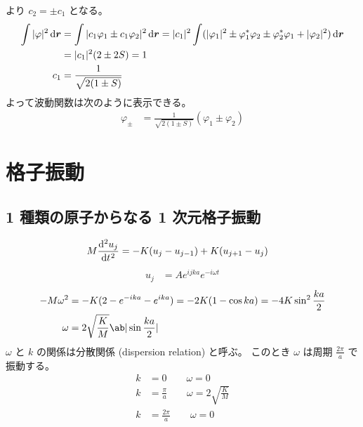 \documentclass[uplatex,dvipdfmx,a4paper,11pt]{jlreq}
\begin{document}
より $c_2 = \pm c_1$ となる。
\begin{align}
  \int|\varphi|^2\dl{\rr} & = \int|c_1\varphi_1 \pm c_1\varphi_2|^2\dl{\rr} = |c_1|^2\int(|\varphi_1|^2 \pm \varphi_1^*\varphi_2 \pm\varphi_2^*\varphi_1 + |\varphi_2|^2)\dl{\rr} \\
                          & = |c_1|^2(2 \pm 2S) = 1                                                                                                                               \\
  c_1                     & = \frac{1}{\sqrt{2(1 \pm S)}}
\end{align}
よって波動関数は次のように表示できる。
\begin{align}
  \varphi_\pm & = \frac{1}{\sqrt{2(1 \pm S)}}(\varphi_1 \pm \varphi_2)
\end{align}


\section{格子振動}
\subsection{1 種類の原子からなる 1 次元格子振動}
\begin{align}
  M\diff[2]{u_j}{t} & = -K(u_j - u_{j-1}) + K(u_{j+1} - u_j)
\end{align}
\begin{align}
  u_j & = Ae^{ijka}e^{-i\omega t}
\end{align}
\begin{align}
  -M\omega^2 & = -K(2 - e^{-ika} - e^{ika}) = -2K(1 - \cos ka) = -4K\sin^2\frac{ka}{2} \\
  \omega     & = 2\sqrt{\frac{K}{M}}\ab|\sin\frac{ka}{2}|
\end{align}
$\omega$ と $k$ の関係は分散関係 (dispersion relation) と呼ぶ。
このとき $\omega$ は周期 $\frac{2\pi}{a}$ で振動する。
\begin{align}
  k & = 0 \qquad \omega = 0                               \\
  k & = \frac{\pi}{a} \qquad \omega = 2\sqrt{\frac{K}{M}} \\
  k & = \frac{2\pi}{a} \qquad \omega = 0
\end{align}
\end{document}

